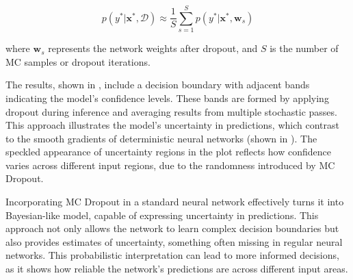 \[ p(y^* | \mathbf{x}^*, \mathcal{D}) \approx \frac{1}{S} \sum_{s=1}^S p(y^* | \mathbf{x}^*, \mathbf{w}_s) \]

where $ \mathbf{w}_s $ represents the network weights after dropout, and $ S $ is the number of MC samples or dropout iterations.

The results, shown in , include a decision boundary with adjacent bands indicating the model's confidence levels. These bands are formed by applying dropout during inference and averaging results from multiple stochastic passes. This approach illustrates the model's uncertainty in predictions, which contrast to the smooth gradients of deterministic neural networks (shown in ). The speckled appearance of uncertainty regions in the plot reflects how confidence varies across different input regions, due to the randomness introduced by MC Dropout.

Incorporating MC Dropout in a standard neural network effectively turns it into Bayesian-like model, capable of expressing uncertainty in predictions. This approach not only allows the network to learn complex decision boundaries but also provides estimates of uncertainty, something often missing in regular neural networks. This probabilistic interpretation can lead to more informed decisions, as it shows how reliable the network's predictions are across different input areas.

